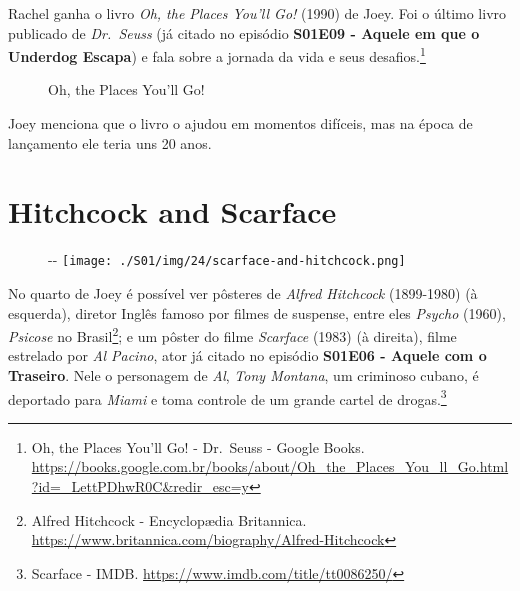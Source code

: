 \saveparinfos
\noindent
\begin{minipage}[c]{0.5\textwidth}\useparinfo

Rachel ganha o livro \emph{Oh, the Places You'll Go!} (1990) de Joey.
Foi o último livro publicado de \emph{Dr.~Seuss} (já citado no episódio
\textbf{\textcolor{primarycolor}{S01E09 - Aquele em que o Underdog Escapa}})
e fala sobre a jornada da vida e seus desafios.\footnote{\sloppy Oh, the Places You’ll Go! - Dr. Seuss - Google Books. \url{https://books.google.com.br/books/about/Oh_the_Places_You_ll_Go.html?id=_LettPDhwR0C\&redir_esc=y}}

\end{minipage}\hfill
\begin{minipage}[c]{0.5\textwidth}

\begin{figure}
  \centering
    \caption{Oh, the Places You’ll Go!\label{fig:oh-the-places-you-ll-go}}
\end{figure}

\end{minipage}

Joey menciona que o livro o ajudou em momentos difíceis, mas na época de
lançamento ele teria uns 20 anos.

\hypertarget{hitchcock-and-scarface}{%
\section{Hitchcock and Scarface}\label{hitchcock-and-scarface}}

\begin{figure}[!ht]
  \begin{adjustwidth}{-\oddsidemargin-1in}{-\rightmargin}
    \centering
    \texttt{[image: ./S01/img/24/scarface-and-hitchcock.png]}
  \end{adjustwidth}
\end{figure}

No quarto de Joey é possível ver pôsteres de \emph{Alfred Hitchcock}
(1899-1980) (à esquerda), diretor Inglês famoso por filmes de suspense,
entre eles \emph{Psycho} (1960), \emph{Psicose} no Brasil\footnote{\sloppy Alfred Hitchcock - Encyclopædia Britannica. \url{https://www.britannica.com/biography/Alfred-Hitchcock}};
e um pôster do filme \emph{Scarface} (1983) (à direita), filme estrelado
por \emph{Al Pacino}, ator já citado no episódio
\textbf{\textcolor{primarycolor}{S01E06 - Aquele com o Traseiro}}. Nele
o personagem de \emph{Al}, \emph{Tony Montana}, um criminoso cubano, é
deportado para \emph{Miami} e toma controle de um grande cartel de
drogas.\footnote{\sloppy Scarface - IMDB. \url{https://www.imdb.com/title/tt0086250/}}

